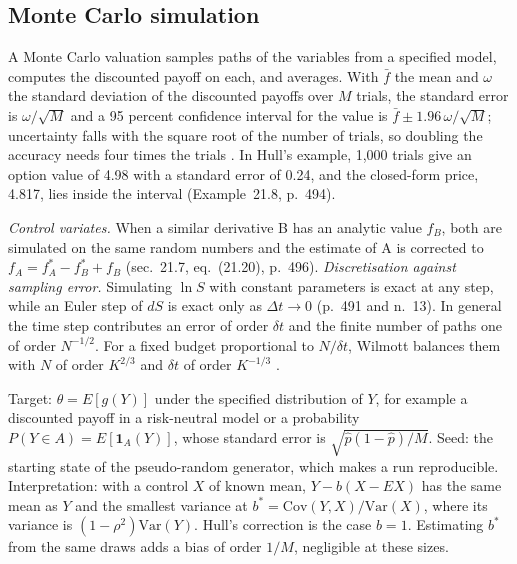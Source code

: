 \subsection{Monte Carlo simulation}

\begin{qfmethod}\label{meth:monte-carlo-simulation}
 A Monte Carlo valuation samples paths of the variables from a specified model, computes the discounted payoff on each, and averages. With $\bar f$ the mean and $\omega$ the standard deviation of the discounted payoffs over $M$ trials, the standard error is $\omega/\sqrt M$ and a 95 percent confidence interval for the value is $\bar f\pm1.96\,\omega/\sqrt M$; uncertainty falls with the square root of the number of trials, so doubling the accuracy needs four times the trials \citep[chap.~21, sec.~21.6, pp.~492--494]{s7-hulloptions}. In Hull's example, 1{,}000 trials give an option value of 4.98 with a standard error of 0.24, and the closed-form price, 4.817, lies inside the interval (Example~21.8, p.~494).

\emph{Control variates.} When a similar derivative B has an analytic value $f_B$, both are simulated on the same random numbers and the estimate of A is corrected to $f_A=f_A^*-f_B^*+f_B$ (sec.~21.7, eq.~(21.20), p.~496). \emph{Discretisation against sampling error.} Simulating $\ln S$ with constant parameters is exact at any step, while an Euler step of $dS$ is exact only as $\Delta t\to0$ (p.~491 and n.~13). In general the time step contributes an error of order $\delta t$ and the finite number of paths one of order $N^{-1/2}$. For a fixed budget proportional to $N/\delta t$, Wilmott balances them with $N$ of order $K^{2/3}$ and $\delta t$ of order $K^{-1/3}$ \citep[chap.~80, secs.~80.4--80.6, pp.~1266--1268]{wide-wilmott-pwoqf}.

 Target: $\theta=E[g(Y)]$ under the specified distribution of $Y$, for example a discounted payoff in a risk-neutral model or a probability $P(Y\in A)=E[\mathbf 1_A(Y)]$, whose standard error is $\sqrt{\hat p(1-\hat p)/M}$. Seed: the starting state of the pseudo-random generator, which makes a run reproducible. Interpretation: with a control $X$ of known mean, $Y-b(X-E X)$ has the same mean as $Y$ and the smallest variance at $b^*=\mathrm{Cov}(Y,X)/\mathrm{Var}(X)$, where its variance is $(1-\rho^2)\mathrm{Var}(Y)$. Hull's correction is the case $b=1$. Estimating $b^*$ from the same draws adds a bias of order $1/M$, negligible at these sizes.


\end{qfmethod}
